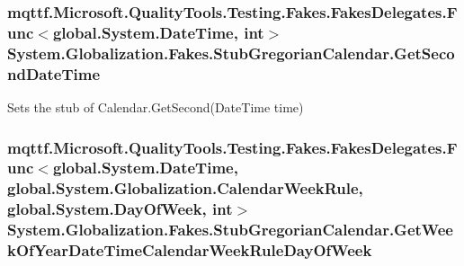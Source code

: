 \hypertarget{class_system_1_1_globalization_1_1_fakes_1_1_stub_gregorian_calendar_a6e2a20d203b41609f0696712cff8e083}{
\subsubsection[{Get\-Second\-Date\-Time}]{\setlength{\rightskip}{0pt plus 5cm}mqttf.\-Microsoft.\-Quality\-Tools.\-Testing.\-Fakes.\-Fakes\-Delegates.\-Func$<$global.\-System.\-Date\-Time, int$>$ System.\-Globalization.\-Fakes.\-Stub\-Gregorian\-Calendar.\-Get\-Second\-Date\-Time}}\label{class_system_1_1_globalization_1_1_fakes_1_1_stub_gregorian_calendar_a6e2a20d203b41609f0696712cff8e083}


Sets the stub of Calendar.\-Get\-Second(\-Date\-Time time)

\hypertarget{class_system_1_1_globalization_1_1_fakes_1_1_stub_gregorian_calendar_a80593d0817760e4dfa7d33987f936da1}{
\subsubsection[{Get\-Week\-Of\-Year\-Date\-Time\-Calendar\-Week\-Rule\-Day\-Of\-Week}]{\setlength{\rightskip}{0pt plus 5cm}mqttf.\-Microsoft.\-Quality\-Tools.\-Testing.\-Fakes.\-Fakes\-Delegates.\-Func$<$global.\-System.\-Date\-Time, global.\-System.\-Globalization.\-Calendar\-Week\-Rule, global.\-System.\-Day\-Of\-Week, int$>$ System.\-Globalization.\-Fakes.\-Stub\-Gregorian\-Calendar.\-Get\-Week\-Of\-Year\-Date\-Time\-Calendar\-Week\-Rule\-Day\-Of\-Week}}\label{class_system_1_1_globalization_1_1_fakes_1_1_stub_gregorian_calendar_a80593d0817760e4dfa7d33987f936da1}


